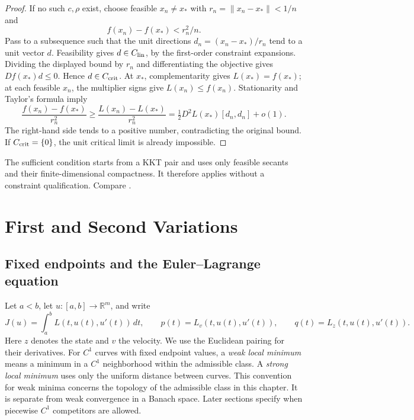 \documentclass[11pt,oneside,openany]{book}
\theoremstyle{plain}
\theoremstyle{definition}
\theoremstyle{remark}
\begin{document}
\begin{proof}
If no such \(c,\rho\) exist, choose feasible
\(x_n\ne x_*\) with \(r_n=\|x_n-x_*\|<1/n\) and
\[
 f(x_n)-f(x_*)<r_n^2/n .
\]
Pass to a subsequence such that the unit directions
\(d_n=(x_n-x_*)/r_n\) tend to a unit vector \(d\).
Feasibility gives \(d\in C_{\rm lin}\), by the
first-order constraint expansions. Dividing the
displayed bound by \(r_n\) and differentiating
the objective gives \(Df(x_*)d\le0\). Hence
\(d\in C_{\rm crit}\).
At \(x_*\), complementarity gives \(L(x_*)=f(x_*)\);
at each feasible \(x_n\), the multiplier signs
give \(L(x_n)\le f(x_n)\).
Stationarity and Taylor's formula imply
\[
 \frac{f(x_n)-f(x_*)}{r_n^2}
 \ge
 \frac{L(x_n)-L(x_*)}{r_n^2}
 =\tfrac12D^2L(x_*)[d_n,d_n]+o(1).
\]
The right-hand side tends to a positive number,
contradicting the original bound. If
\(C_{\rm crit}=\{0\}\), the unit critical limit
is already impossible.
\end{proof}

The sufficient condition starts from a KKT pair
and uses only feasible secants and their finite-dimensional
compactness. It therefore applies without a constraint
qualification. Compare \cite[Theorem 12.6]{NocedalWright}.
\chapter{First and Second Variations}

\section{Fixed endpoints and the Euler--Lagrange equation}
\label{v07-01}

Let \(a<b\), let \(u:[a,b]\to\mathbb R^m\), and write
\[
 J(u)=\int_a^b L(t,u(t),u'(t))\,dt,\qquad
 p(t)=L_v(t,u(t),u'(t)),\qquad q(t)=L_z(t,u(t),u'(t)).
\]
Here \(z\) denotes the state and \(v\) the velocity. We use the
Euclidean pairing for their derivatives. For \(C^1\) curves with
fixed endpoint values, a \emph{weak local minimum} means a minimum
in a \(C^1\) neighborhood within the admissible class. A
\emph{strong local minimum} uses only the uniform distance between
curves. This convention for weak minima concerns the topology of
the admissible class in this chapter. It is separate from weak
convergence in a Banach space. Later sections specify when
piecewise \(C^1\) competitors are allowed.
\end{document}
